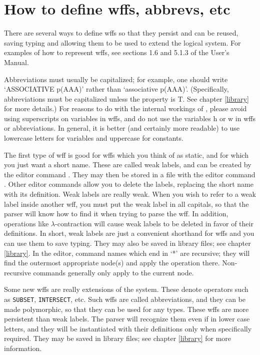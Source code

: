 \chapter{How to define wffs, abbrevs, etc}
\label{wffs}

There are several ways to define wffs so that they persist and
can be reused, saving typing and allowing them to be used to
extend the logical system.  For examples of how to represent
wffs, see sections 1.6 and 5.1.3 of the {\ETPS} User's Manual.

Abbreviations must usually be capitalized; for example, one should write
`ASSOCIATIVE p(AAA)' rather than `associative p(AAA)'. (Specifically, abbreviations
must be capitalized unless the  property is T. See chapter \ref{library}
for more details.) For reasons
to do with the internal workings of {\TPS}, please avoid using superscripts
on variables in wffs, and do not use the variables h or w in wffs or
abbreviations. In general, it is better (and certainly more readable)
to use lowercase letters for variables and uppercase for constants.

The first type of wff is good for wffs which you think of as static,
and for which you just want a short name.  These are called weak labels,
and can be created by the editor command .  They may then be
stored in a file with the editor command .  Other editor
commands allow you to delete the labels, replacing the short name
with its definition.  Weak labels are really weak.  When you wish to
refer to a weak label inside another wff, you must put the weak label
in all capitals, so that the parser will know how to find it when trying
to parse the wff.  In addition, operations like $\lambda$-contraction will
cause weak labels to be deleted in favor of their definitions.  In
short, weak labels are just a convenient shorthand for wffs and you
can use them to save typing.  They may also be saved in library files;
see chapter \ref{library}. In the editor, command names which end in `*'
are recursive; they will find the outermost appropriate node(s) and apply
the operation there. Non-recursive commands generally only apply to the current
node.

Some new wffs are really extensions of the system.  These denote operators
such as {\tt SUBSET}, {\tt INTERSECT}, etc.  Such wffs are called
abbreviations, and they can be made polymorphic, so that they can be
used for any types.  These wffs are more persistent than weak labels.
The parser will recognize them even if in lower case letters, and they
will be instantiated with their definitions only when specifically
required.  They may be saved in library files; see chapter \ref{library}
for more information.

